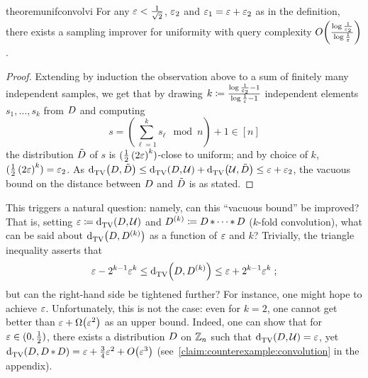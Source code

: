\begin{restatable}{theorem}{unifconvolvi}\label{lemma:sampling:corrector:uniformity}
  For any $\varepsilon< \frac{1}{\sqrt{2}}$, $\varepsilon_2$ and $\varepsilon_1=\varepsilon+\varepsilon_2$ as in the definition, there exists a sampling improver for uniformity with query complexity $\bigO{\frac{\log\frac{1}{\eps_2}}{\log\frac{1}{\eps}}}$.
\end{restatable}
\begin{proof}
 Extending by induction the observation above to a sum of finitely many independent samples, we get that by drawing $k\coloneqq\frac{\log\frac{1}{\varepsilon_2}-1}{\log\frac{1}{\varepsilon}-1}$ independent elements $s_1,\dots,s_k$ from $D$ and computing
  \[
  s=\left(\sum_{\ell=1}^k s_\ell \mod n\right) + 1 \in [n]
  \]
  the distribution $\tilde{D}$ of $s$ is $(\frac{1}{2}\left( 2\varepsilon\right)^k)$-close to uniform; and by choice of $k$, $(\frac{1}{2}\left( 2\varepsilon\right)^k)=\varepsilon_2$.  As ${\operatorname{d}_{\textrm{TV}}^{}\!\left({ D ,  \tilde{D} }\right)} \leq {\operatorname{d}_{\textrm{TV}}^{}\!\left({ \ensuremath{D},  \ensuremath{\mathcal{U}}}\right)} + {\operatorname{d}_{\textrm{TV}}^{}\!\left({ \mathcal{U} ,  \tilde{D} }\right)} \leq \varepsilon+\varepsilon_2$, the vacuous bound on the distance between $D$ and $\tilde{D}$ is as stated.
\end{proof}

This triggers a natural question: namely, can this ``vacuous bound'' be improved? That is, setting $\varepsilon\coloneqq{\operatorname{d}_{\textrm{TV}}^{}\!\left({ \ensuremath{D},  \ensuremath{\mathcal{U}}}\right)}$ and $D^{(k)}\coloneqq D\operatorname{\ast}\cdots\operatorname{\ast} D$ ($k$-fold convolution), what can be said about ${\operatorname{d}_{\textrm{TV}}^{}\!\left({ D ,  D^{(k)} }\right)}$ as a function of $\varepsilon$ and $k$? Trivially, the triangle inequality asserts that
  \[
          \varepsilon - 2^{k-1}\varepsilon^k \leq {\operatorname{d}_{\textrm{TV}}^{}\!\left({ \ensuremath{D},  \ensuremath{D}^{(k)} }\right)} \leq \varepsilon + 2^{k-1}\varepsilon^k\;;
  \]
  but can  the right-hand side be tightened further? For instance, one might hope to achieve $\varepsilon$. Unfortunately, this is not the case: even for $k=2$, one cannot get better than $\eps + \bigOmega{\eps^2}$ as an upper bound. Indeed, one can show that for $\varepsilon\in(0,\frac12)$, there exists a distribution $D$ on $\mathbb{Z}_n$ such that ${\operatorname{d}_{\textrm{TV}}^{}\!\left({ D ,  \mathcal{U} }\right)} = \varepsilon$, yet $\totalvardist{ \D }{ \D\convolution \D } = \eps + \frac{3}{4}\eps^2 + \bigO{\eps^3}$ (see~\autoref{claim:counterexample:convolution} in the appendix).

